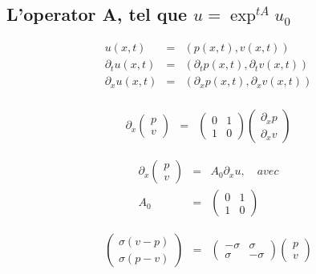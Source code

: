 \documentclass[a4paper,11pt]{article}
\begin{document}
\subsection*{L'operator A, tel que \( u = \exp^{tA}u_{0} \)}

\begin{equation*}
\begin{array}{rcl}
    u(x,t) &=& (p(x,t), v(x,t)) \\
    \partial_{t}u(x,t) &=& (\partial_{t}p(x,t),  \partial_{t}v(x,t)) \\
    \partial_{x}u(x,t) &=& (\partial_{x}p(x,t),  \partial_{x}v(x,t)) \\
\end{array}
\end{equation*}

\begin{equation*}
\begin{array}{rcl}
    \partial_{x}
    \begin{pmatrix}
        p \\
        v
    \end{pmatrix} &=&
    \begin{pmatrix}
        0 & 1 \\
        1 & 0
    \end{pmatrix}
    \begin{pmatrix}
        \partial_{x}p \\
        \partial_{x}v
    \end{pmatrix}
\end{array}
\end{equation*}

\begin{equation*}
\begin{array}{rcl}
    \partial_{x}
    \begin{pmatrix}
        p \\
        v
    \end{pmatrix} &=&
    A_{0}\partial_{x}u, \quad avec \\
    A_{0} &=&
        \begin{pmatrix}
            0 & 1 \\
            1 & 0
        \end{pmatrix}
\end{array}
\end{equation*}

\begin{equation*}
\begin{array}{rcl}
    \begin{pmatrix}
        \sigma(v-p) \\
        \sigma(p-v)
    \end{pmatrix} &=&
    \begin{pmatrix}
        -\sigma & \sigma \\
        \sigma & -\sigma
    \end{pmatrix}
    \begin{pmatrix}
        p \\
        v
    \end{pmatrix}
\end{array}
\end{equation*}
\end{document}
